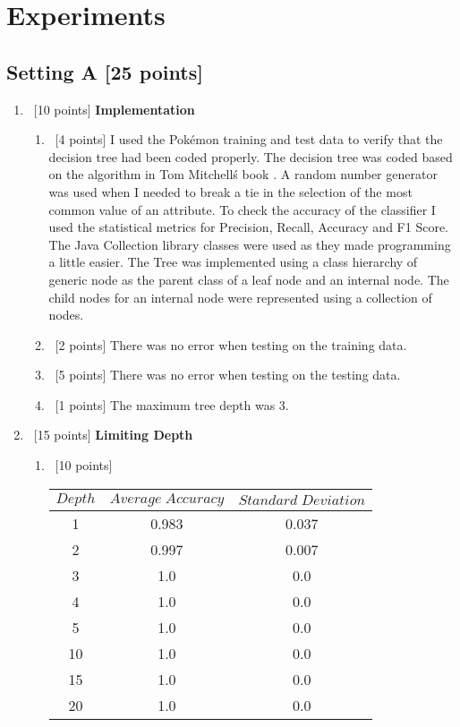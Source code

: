\section{Experiments}
\label{sec:q1}

\subsection*{Setting A [25 points]}

\begin{enumerate}
\item ~[10 points] \textbf{Implementation}

  \begin{enumerate}
  \item ~[4 points] I used the Pok\'emon training and test data to verify that the decision tree had been coded properly. The decision tree was coded based on the algorithm in Tom Mitchell\'s book \cite{Mitchell}. A random number generator was used when I needed to break a tie in the selection of the most common value of an attribute. To check the accuracy of the classifier I used the statistical metrics for Precision, Recall, Accuracy and F1 Score. The Java Collection library classes were used as they made programming a little easier. The Tree was implemented using a class hierarchy of generic node as the parent class of a leaf node and an internal node. The child nodes for an internal node were represented using a collection of nodes.
    
  \item ~[2 points]  There was no error when testing on the training data.
    
  \item ~[5 points] There was no error when testing on the testing data.
    
  \item ~[1 points] The maximum tree depth was 3.
  \end{enumerate}

\item ~[15 points] \textbf{Limiting Depth}

  \begin{enumerate}
  \item ~[10 points] 
    \begin{center}
    \begin{tabular}{c|c|c}
      $Depth$ & $Average \; Accuracy$ & $Standard \;Deviation$\\ \hline
      1 & 0.983 & 0.037\\
      2 &  0.997 & 0.007\\
       3 & 1.0 & 0.0\\
       4 & 1.0 & 0.0\\
       5 & 1.0 & 0.0\\
       10 &1.0 & 0.0\\
      15 & 1.0 & 0.0\\
      20 & 1.0 & 0.0
    \end{tabular}
  \end{center}
    

\end{enumerate}
\end{enumerate}
